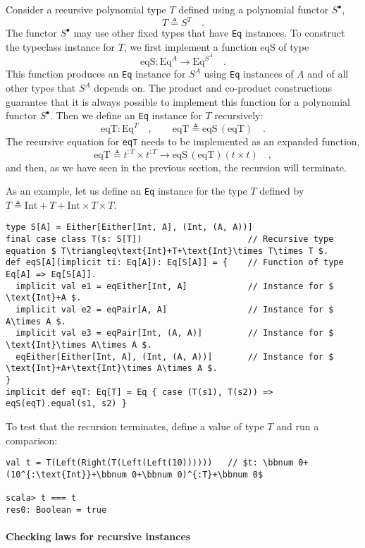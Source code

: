 Consider a recursive polynomial type $T$ defined using a polynomial
functor $S^{\bullet}$,
\[
T\triangleq S^{T}\quad.
\]
The functor $S^{\bullet}$ may use other fixed types that have \lstinline!Eq!
instances. To construct the typeclass instance for $T$, we first
implement a function $\text{eqS}$ of type
\[
\text{eqS}:\text{Eq}^{A}\rightarrow\text{Eq}^{S^{A}}\quad.
\]
This function produces an \lstinline!Eq! instance for $S^{A}$ using
\lstinline!Eq! instances of $A$ and of all other types that $S^{A}$
depends on. The product and co-product constructions guarantee that
it is always possible to implement this function for a polynomial
functor $S^{\bullet}$. Then we define an \lstinline!Eq! instance
for $T$ recursively:
\[
\text{eqT}:\text{Eq}^{T}\quad,\quad\quad\text{eqT}\triangleq\text{eqS}\,(\text{eqT})\quad.
\]
The recursive equation for \lstinline!eqT! needs to be implemented
as an expanded function, 
\[
\text{eqT}\triangleq t^{:T}\times t^{:T}\rightarrow\text{eqS}\,(\text{eqT})\left(t\times t\right)\quad,
\]
and then, as we have seen in the previous section, the recursion will
terminate.

As an example, let us define an \lstinline!Eq! instance for the type
$T$ defined by $T\triangleq\text{Int}+T+\text{Int}\times T\times T$.
\begin{lstlisting}[mathescape=true]
type S[A] = Either[Either[Int, A], (Int, (A, A))]
final case class T(s: S[T])                     // Recursive type equation $ T\triangleq\text{Int}+T+\text{Int}\times T\times T $.
def eqS[A](implicit ti: Eq[A]): Eq[S[A]] = {    // Function of type Eq[A] => Eq[S[A]].
  implicit val e1 = eqEither[Int, A]            // Instance for $ \text{Int}+A $.
  implicit val e2 = eqPair[A, A]                // Instance for $ A\times A $.
  implicit val e3 = eqPair[Int, (A, A)]         // Instance for $ \text{Int}\times A\times A $.
  eqEither[Either[Int, A], (Int, (A, A))]       // Instance for $ \text{Int}+A+\text{Int}\times A\times A $.
}
implicit def eqT: Eq[T] = Eq { case (T(s1), T(s2)) => eqS(eqT).equal(s1, s2) }
\end{lstlisting}
To test that the recursion terminates, define a value of type $T$
and run a comparison:
\begin{lstlisting}[mathescape=true]
val t = T(Left(Right(T(Left(Left(10))))))   // $t: \bbnum 0+(10^{:\text{Int}}+\bbnum 0+\bbnum 0)^{:T}+\bbnum 0$

scala> t === t
res0: Boolean = true
\end{lstlisting}


\paragraph{Checking laws for recursive instances}


